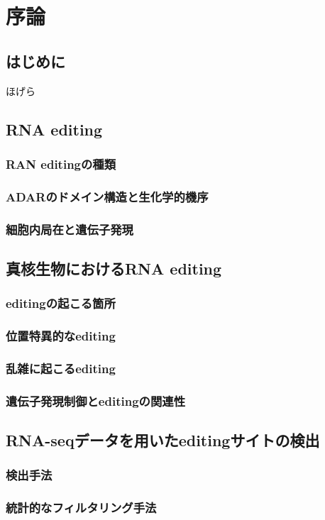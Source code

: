 \chapter{序論}
\section{はじめに}
\cite{pmid21547992}ほげら
\section{RNA editing}
\subsection{RAN editingの種類}

\subsection{ADARのドメイン構造と生化学的機序}
\subsection{細胞内局在と遺伝子発現}

\section{真核生物におけるRNA editing}
\subsection{editingの起こる箇所}
\subsection{位置特異的なediting}
\subsection{乱雑に起こるediting}
\subsection{遺伝子発現制御とeditingの関連性}

\section{RNA-seqデータを用いたeditingサイトの検出}
\subsection{検出手法}
\subsection{統計的なフィルタリング手法}



